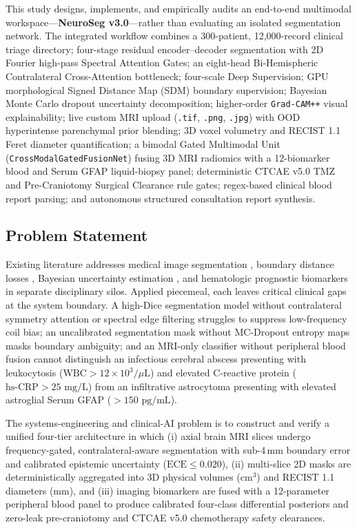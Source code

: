\documentclass[conference]{IEEEtran}
\begin{document}
This study designs, implements, and empirically audits an end-to-end multimodal workspace---\textbf{NeuroSeg v3.0}---rather than evaluating an isolated segmentation network. The integrated workflow combines a 300-patient, 12,000-record clinical triage directory; four-stage residual encoder--decoder segmentation with 2D Fourier high-pass Spectral Attention Gates; an eight-head Bi-Hemispheric Contralateral Cross-Attention bottleneck; four-scale Deep Supervision; GPU morphological Signed Distance Map (SDM) boundary supervision; Bayesian Monte Carlo dropout uncertainty decomposition; higher-order \texttt{Grad-CAM++} visual explainability; live custom MRI upload (\texttt{.tif}, \texttt{.png}, \texttt{.jpg}) with OOD hyperintense parenchymal prior blending; 3D voxel volumetry and RECIST 1.1 Feret diameter quantification; a bimodal Gated Multimodal Unit (\texttt{CrossModalGatedFusionNet}) fusing 3D MRI radiomics with a 12-biomarker blood and Serum GFAP liquid-biopsy panel; deterministic CTCAE v5.0 TMZ and Pre-Craniotomy Surgical Clearance rule gates; regex-based clinical blood report parsing; and autonomous structured consultation report synthesis.

\subsection{Problem Statement}
Existing literature addresses medical image segmentation \cite{oktay2018attention, isensee2021nnunet, chen2021transunet}, boundary distance losses \cite{kervadec2021boundary}, Bayesian uncertainty estimation \cite{kendall2017uncertainties, gal2016dropout}, and hematologic prognostic biomarkers \cite{bambury2013nlr, perez2021gfap} in separate disciplinary silos. Applied piecemeal, each leaves critical clinical gaps at the system boundary. A high-Dice segmentation model without contralateral symmetry attention or spectral edge filtering struggles to suppress low-frequency coil bias; an uncalibrated segmentation mask without MC-Dropout entropy maps masks boundary ambiguity; and an MRI-only classifier without peripheral blood fusion cannot distinguish an infectious cerebral abscess presenting with leukocytosis ($\text{WBC} > 12 \times 10^3/\mu\text{L}$) and elevated C-reactive protein ($\text{hs-CRP} > 25\text{ mg/L}$) from an infiltrative astrocytoma presenting with elevated astroglial Serum GFAP ($> 150\text{ pg/mL}$).

The systems-engineering and clinical-AI problem is to construct and verify a unified four-tier architecture in which (i) axial brain MRI slices undergo frequency-gated, contralateral-aware segmentation with sub-4\,mm boundary error and calibrated epistemic uncertainty ($\text{ECE} \le 0.020$), (ii) multi-slice 2D masks are deterministically aggregated into 3D physical volumes ($\text{cm}^3$) and RECIST 1.1 diameters ($\text{mm}$), and (iii) imaging biomarkers are fused with a 12-parameter peripheral blood panel to produce calibrated four-class differential posteriors and zero-leak pre-craniotomy and CTCAE v5.0 chemotherapy safety clearances.
\end{document}
